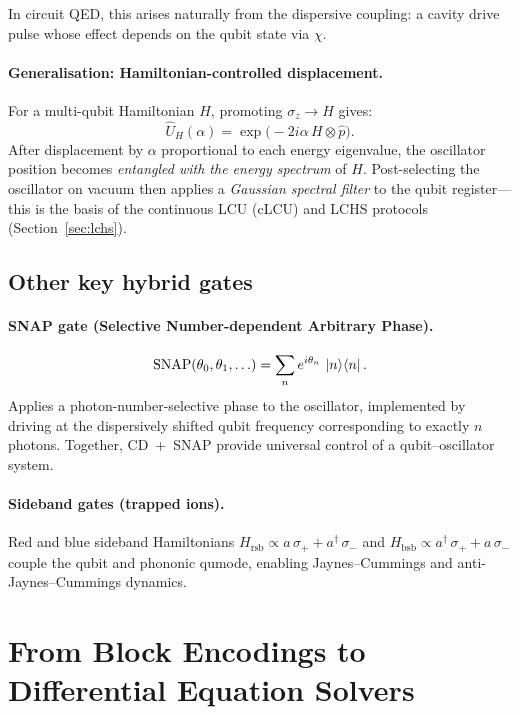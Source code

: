 \documentclass[11pt]{article}
\newcommand{\ph}{\hat{p}}
\newcommand{\ad}{a^{\dagger}}
\begin{document}
In circuit QED, this arises naturally from the dispersive coupling: a
cavity drive pulse whose effect depends on the qubit state via $\chi$.

\paragraph{Generalisation: Hamiltonian-controlled displacement.}
For a multi-qubit Hamiltonian $H$, promoting $\sigma_z \to H$ gives:
\begin{equation}\label{eq:ham-controlled-disp}
\hat{U}_{H}(\alpha) = \exp\!\big(-2i\alpha\, H \otimes \ph\big).
\end{equation}
After displacement by $\alpha$ proportional to each energy eigenvalue,
the oscillator position becomes \emph{entangled with the energy spectrum}
of $H$.  Post-selecting the oscillator on vacuum then applies a
\emph{Gaussian spectral filter} to the qubit register---this is the basis
of the continuous LCU (cLCU) and LCHS protocols
(Section~\ref{sec:lchs}).

\subsection{Other key hybrid gates}

\paragraph{SNAP gate (Selective Number-dependent Arbitrary Phase).}
\begin{equation}
\mathrm{SNAP}(\theta_0, \theta_1, \ldots)
= \sum_n e^{i\theta_n}\, \ket{n}\!\bra{n}.
\end{equation}
Applies a photon-number-selective phase to the oscillator,
implemented by driving at the dispersively shifted qubit frequency
corresponding to exactly $n$ photons.
Together, CD~+~SNAP provide universal control of a qubit--oscillator
system.

\paragraph{Sideband gates (trapped ions).}
Red and blue sideband Hamiltonians
$H_{\mathrm{rsb}} \propto a\,\sigma_+ + \ad\,\sigma_-$
and
$H_{\mathrm{bsb}} \propto \ad\,\sigma_+ + a\,\sigma_-$
couple the qubit and phononic qumode, enabling Jaynes--Cummings and
anti-Jaynes--Cummings dynamics.

\section{From Block Encodings to Differential Equation Solvers}
\label{sec:de-solvers}
\end{document}
